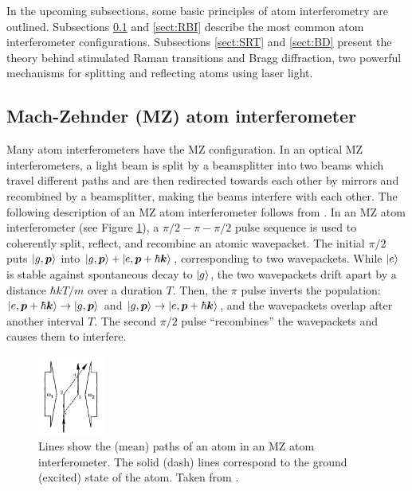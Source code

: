\documentclass[reprint,
nofootinbib,
amsmath,amssymb,
aps]{revtex4-1}
\begin{document}
In the upcoming subsections, some basic principles of atom interferometry are outlined. Subsections \ref{sect:MZI} and \ref{sect:RBI} describe the most common atom interferometer configurations. Subsections \ref{sect:SRT} and \ref{sect:BD} present the theory behind stimulated Raman transitions and Bragg diffraction, two powerful mechanisms for splitting and reflecting atoms using laser light.  





\subsection{Mach-Zehnder (MZ) atom interferometer}\label{sect:MZI}

Many atom interferometers have the MZ configuration. In an optical MZ interferometers,  a light beam is split by a beamsplitter into two beams which travel different paths and are then redirected towards each other by mirrors and recombined by a beamsplitter, making the beams interfere with each other. The following description of an MZ atom interferometer follows from \cite{kasevich1992measurement}. In an MZ atom interferometer (see Figure \ref{fig:MZI}), a $\pi/2-\pi-\pi/2$ pulse sequence is used to coherently split, reflect, and recombine an atomic wavepacket. The initial $\pi/2$ puts $\ket{g,\bm{p}}$ into $\ket{g,\bm{p}} + \ket{e,\bm{p} + \hbar \bm{k}}$, corresponding to two wavepackets. While $\ket{e}$ is stable against spontaneous decay to $\ket{g}$, the two wavepackets drift apart by a distance $\hbar kT /m$ over a duration $T$. Then, the $\pi$ pulse inverts the population: $\ket{e,\bm{p} + \hbar \bm{k}} \to \ket{g, \bm{p}}$ and $\ket{g,\bm{p}} \to \ket{e,\bm{p} + \hbar \bm{k}}$, and the wavepackets overlap after another interval $T$. The second $\pi/2$ pulse ``recombines'' the wavepackets and causes them to interfere.


\begin{figure}
	\includegraphics[width=0.2\textwidth]{MZI.png}
	\caption{Lines show the (mean) paths of an atom in an MZ atom interferometer. The solid (dash) lines correspond to the ground (excited) state of the atom.  Taken from \cite{kasevich1992measurement}.}
	\label{fig:MZI}
\end{figure}
\end{document}
